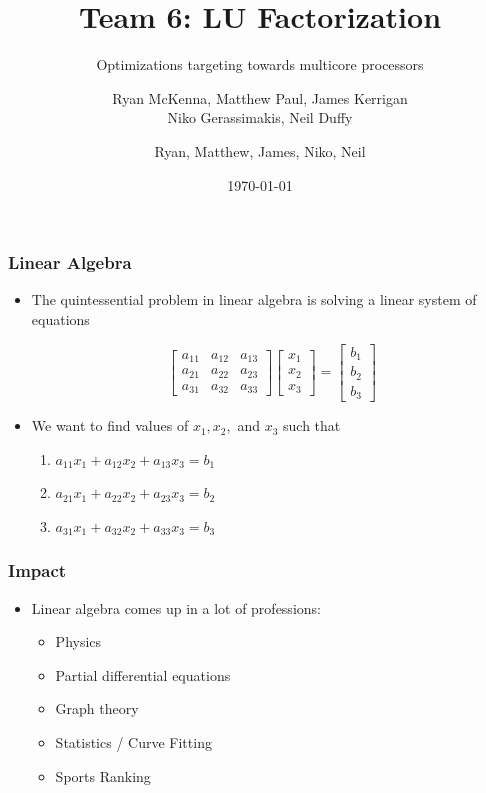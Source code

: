 \documentclass{beamer}
\author{Ryan McKenna, Matthew Paul, James Kerrigan \\
Niko Gerassimakis, Neil Duffy }
\title{Team 6: LU Factorization}
\subtitle{Optimizations targeting towards multicore processors}
\date{\today}
\begin{document}
\frame{\maketitle}
\author{Ryan, Matthew, James, Niko, Neil}

\begin{frame}

\frametitle{Linear Algebra}

\begin{itemize}
\item The quintessential problem in linear algebra is solving a linear system of equations

$$
\begin{bmatrix}
	a_{11} &  a_{12} &  a_{13}  \\
	a_{21}  &  a_{22} &  a_{23}  \\
	a_{31}  &  a_{32}  &  a_{33}
\end{bmatrix}
\begin{bmatrix}
x_1\\x_2\\x_3
\end{bmatrix}
=
\begin{bmatrix}
b_1\\b_2\\b_3
\end{bmatrix}
$$

\item We want to find values of $ x_1, x_2, $ and $ x_3 $ such that 

\begin{enumerate}
\item $ a_{11} x_1 + a_{12} x_2 + a_{13} x_3 = b_1 $
\item $ a_{21} x_1 + a_{22} x_2 + a_{23} x_3 = b_2 $
\item $ a_{31} x_1 + a_{32} x_2 + a_{33} x_3 = b_3 $
\end{enumerate}

\end{itemize}

\end{frame}


\begin{frame}
\frametitle{Impact}

\begin{itemize}
\item Linear algebra comes up in a lot of professions:
\begin{itemize}
\setlength\itemsep{0.25em}
\item Physics
\item Partial differential equations
\item Graph theory
\item Statistics / Curve Fitting
\item Sports Ranking
\end{itemize}

\end{itemize}
	
\end{frame}
\end{document}
